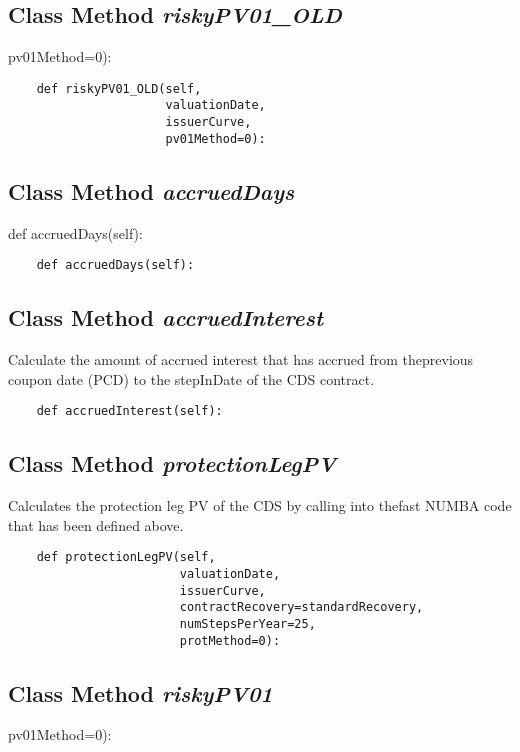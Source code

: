 \documentclass[twoside,11pt]{book}
\begin{document}
\subsection{Class Method {\it riskyPV01\_OLD}}
pv01Method=0):

\begin{lstlisting}
    def riskyPV01_OLD(self,
                      valuationDate,
                      issuerCurve,
                      pv01Method=0):
\end{lstlisting}

\subsection{Class Method {\it accruedDays}}
def accruedDays(self):

\begin{lstlisting}
    def accruedDays(self):
\end{lstlisting}

\subsection{Class Method {\it accruedInterest}}
Calculate the amount of accrued interest that has accrued from theprevious coupon date (PCD) to the stepInDate of the CDS contract. 

\begin{lstlisting}
    def accruedInterest(self):
\end{lstlisting}

\subsection{Class Method {\it protectionLegPV}}
Calculates the protection leg PV of the CDS by calling into thefast NUMBA code that has been defined above. 

\begin{lstlisting}
    def protectionLegPV(self,
                        valuationDate,
                        issuerCurve,
                        contractRecovery=standardRecovery,
                        numStepsPerYear=25,
                        protMethod=0):
\end{lstlisting}

\subsection{Class Method {\it riskyPV01}}
pv01Method=0):
\end{document}
